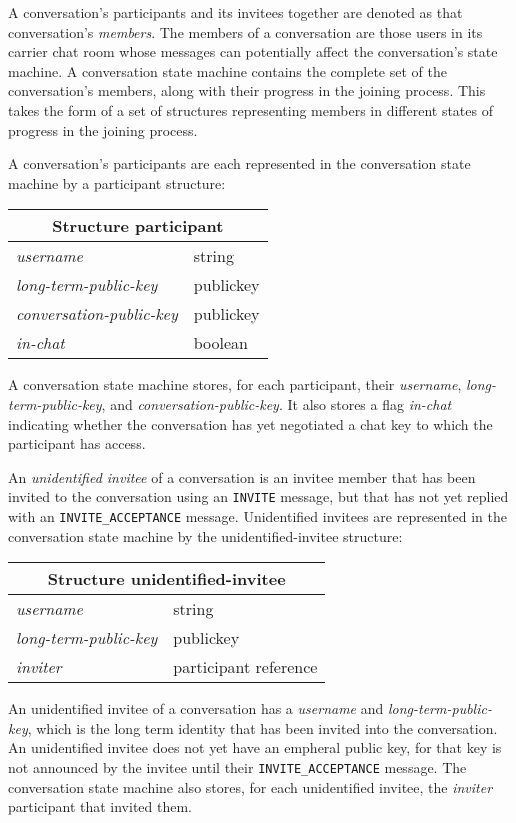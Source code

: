 \documentclass{article}
\def\npmessage#1{\texttt{#1}}
\def\smfield#1{\textsl{#1}}
\def\type#1{\textsf{#1}}
\newenvironment{struct}[1]{
\newcommand{\structfield}[2]{
\smfield{##1} & \type{##2} \\
\hline
}
\par
\vspace{-\medskipamount}
\hspace{2em minus 2em}\begin{tabular}{|l|l|}
\hline
\multicolumn{2}{|c|}{Structure \type{#1}} \\
\hline
\hline
}{
\end{tabular}
\vspace{-\medskipamount}
\par
}
\begin{document}
A conversation's participants and its invitees together are denoted as that conversation's \emph{members}.
The members of a conversation are those users in its carrier chat room whose messages can potentially affect the conversation's state machine.
A conversation state machine contains the complete set of the conversation's members, along with their progress in the joining process.
This takes the form of a set of structures representing members in different states of progress in the joining process.

A conversation's participants are each represented in the conversation state machine by a \type{participant} structure:
\begin{struct}{participant}
\structfield{username}{string}
\structfield{long-term-public-key}{publickey}
\structfield{conversation-public-key}{publickey}
\structfield{in-chat}{boolean}
\end{struct}
A conversation state machine stores, for each participant, their \smfield{username}, \smfield{long-term-public-key}, and \smfield{conversation-public-key}.
It also stores a flag \smfield{in-chat} indicating whether the conversation has yet negotiated a chat key to which the participant has access.

An \emph{unidentified invitee} of a conversation is an invitee member that has been invited to the conversation using an \npmessage{INVITE} message, but that has not yet replied with an \npmessage{INVITE\_ACCEPTANCE} message.
Unidentified invitees are represented in the conversation state machine by the \type{unidentified-invitee} structure:
\begin{struct}{unidentified-invitee}
\structfield{username}{string}
\structfield{long-term-public-key}{publickey}
\structfield{inviter}{participant reference}
\end{struct}
An unidentified invitee of a conversation has a \smfield{username} and \smfield{long-term-public-key}, which is the long term identity that has been invited into the conversation.
An unidentified invitee does not yet have an empheral public key, for that key is not announced by the invitee until their \npmessage{INVITE\_ACCEPTANCE} message.
The conversation state machine also stores, for each unidentified invitee, the \smfield{inviter} participant that invited them.
\end{document}
